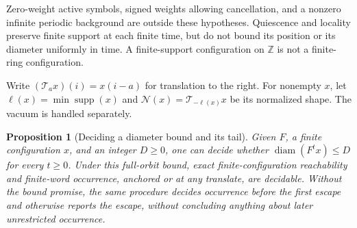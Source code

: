 \documentclass[11pt,letterpaper]{article}
\numberwithin{equation}{section}
\newtheorem{proposition}[theorem]{Proposition}
\theoremstyle{definition}
\theoremstyle{remark}
\newcommand{\Z}{\mathbb Z}
\newcommand{\supp}{\operatorname{supp}}
\newcommand{\diam}{\operatorname{diam}}
\newcommand{\norm}[1]{\mathcal N(#1)}
\begin{document}
Zero-weight active symbols, signed weights allowing cancellation, and a nonzero infinite periodic background are outside these hypotheses. Quiescence and locality preserve finite support at each finite time, but do not bound its position or its diameter uniformly in time. A finite-support configuration on $\Z$ is not a finite-ring configuration.

Write $(\mathcal T_a x)(i)=x(i-a)$ for translation to the right. For nonempty $x$, let $\ell(x)=\min\supp(x)$ and $\norm{x}=\mathcal T_{-\ell(x)}x$ be its normalized shape. The vacuum is handled separately.

\begin{proposition}[Deciding a diameter bound and its tail]\label{smc:sl:prop:bounded}
Given $F$, a finite configuration $x$, and an integer $D\ge0$, one can decide whether $\diam(F^t x)\le D$ for every $t\ge0$. Under this full-orbit bound, exact finite-configuration reachability and finite-word occurrence, anchored or at any translate, are decidable. Without the bound promise, the same procedure decides occurrence before the first escape and otherwise reports the escape, without concluding anything about later unrestricted occurrence.
\end{proposition}
\end{document}
